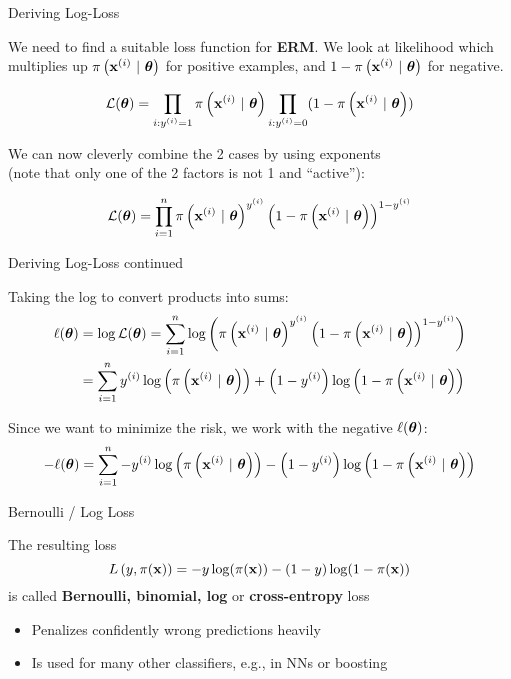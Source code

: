 \documentclass[11pt,compress,t,notes=noshow, xcolor=table]{beamer}
\begin{document}
\begin{vbframe}{Deriving Log-Loss}

We need to find a suitable loss function for \textbf{ERM}. We look at likelihood which multiplies up $\pixit$ for positive examples, and $1-\pixit$ for negative. 


$$
\LLt = \prod_{i: \yi = 1} \pixit \prod_{i: \yi = 0} (1 - \pixit) 
$$

We can now cleverly combine the 2 cases by using exponents \\
(note that only one of the 2 factors is not 1 and \enquote{active}):

$$
\LLt = \prodin \pixit^{\yi} \left(1-\pixit\right)^{1-\yi}
$$

\end{vbframe}

\begin{vbframe}{Deriving Log-Loss continued}

Taking the log to convert products into sums:
\begin{align*}
\loglt &= \log \LLt = 
\sumin \log\left(\pixit^{\yi} \left(1-\pixit\right)^{1-\yi}\right) \\
       &= \sumin \yi \log\left(\pixit\right) + \left(1-\yi\right)\log\left(1-\pixit\right)
\end{align*}

Since we want to minimize the risk, we work with the negative $\loglt$:
$$
- \loglt = \sumin - \yi \log\left(\pixit\right) - \left(1-\yi\right)\log\left(1-\pixit\right)
$$


\end{vbframe}

\begin{vbframe}{Bernoulli / Log Loss}

The resulting loss 
$$\Lpixy = -y\log(\pix)-(1-y)\log(1-\pix)$$ 
is called \textbf{Bernoulli, binomial, log} or \textbf{cross-entropy} loss

\lz


\lz

\begin{itemize}
  \item Penalizes confidently wrong predictions heavily
  \item Is used for many other classifiers, e.g., in NNs or boosting 


  
\end{itemize}


\end{vbframe}
\end{document}
